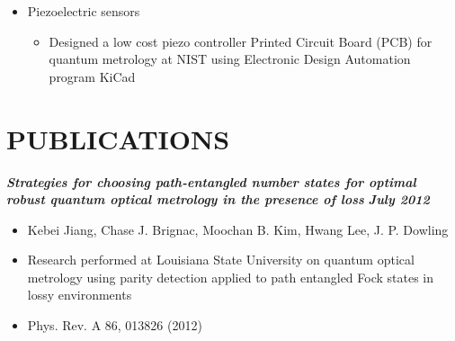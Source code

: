 \documentclass{res}
\begin{document}
\begin{resume}
\begin{itemize}
	 	\item Piezoelectric sensors
	 	\begin{itemize}
	 	\item Designed a low cost piezo controller Printed Circuit Board (PCB) for quantum metrology at NIST using Electronic Design Automation program KiCad
	 	\end{itemize}
	 	\end{itemize}	

\section{PUBLICATIONS}
	{\bfseries {\em Strategies for choosing path-entangled number states for optimal\\robust quantum optical metrology in the presence of loss}} \hfill  {\bfseries {\em July 2012}}
	 	\begin{itemize}  \itemsep -2pt %
		\item Kebei Jiang, Chase J. Brignac, Moochan B. Kim, Hwang Lee, J. P. Dowling
		\item Research performed at Louisiana State University on quantum optical metrology using parity detection applied to path entangled Fock states in lossy environments
		\item Phys. Rev. A 86, 013826 (2012)
		\end{itemize}


\end{resume}
\end{document}
